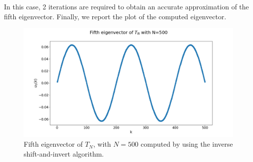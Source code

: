 \documentclass[a4paper,11pt]{article}
\begin{document}
\noindent In this case, 2 iterations are required to obtain an accurate approximation of the fifth eigenvector. Finally, we report the plot of the computed eigenvector.
\begin{figure}[H]
	\centering
	\includegraphics[scale=0.40]{Plot/Fifth_eigvect_tn_n=500.png}
	\caption{Fifth eigenvector of $T_{N}$, with $N=500$ computed by using the inverse shift-and-invert algorithm.}
	\label{Fig:Fifth_eigvect_Tn}
\end{figure}
\end{document}

